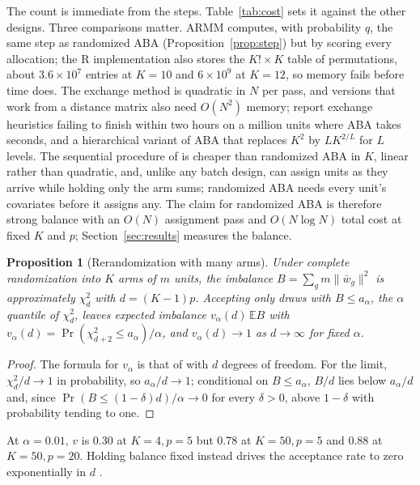 \documentclass[11pt]{article}
\newtheorem{proposition}{Proposition}
\theoremstyle{remark}
\newcommand{\E}{\mathbb{E}}
\begin{document}
The count is immediate from the steps. Table~\ref{tab:cost} sets it against
the other designs. Three comparisons matter. ARMM computes, with probability
$q$, the same step as randomized ABA (Proposition~\ref{prop:step}) but by
scoring every allocation; the R implementation also stores the $K! \times K$
table of permutations, about $3.6 \times 10^7$ entries at $K = 10$ and $6
\times 10^9$ at $K = 12$, so memory fails before time does. The exchange
method is quadratic in $N$ per pass, and versions that work from a distance
matrix also need $O(N^2)$ memory; \citet{baumann2026} report exchange
heuristics failing to finish within two hours on a million units where ABA
takes seconds, and a hierarchical variant of ABA that replaces $K^2$ by
$LK^{2/L}$ for $L$ levels. The sequential procedure of \citet{zhang2023} is
cheaper than randomized ABA in $K$, linear rather than quadratic, and, unlike
any batch design, can assign units as they arrive while holding only the arm
sums; randomized ABA needs every unit's covariates before it assigns any. The
claim for randomized ABA is therefore strong balance with an $O(N)$
assignment pass and $O(N \log N)$ total cost at fixed $K$ and $p$;
Section~\ref{sec:results} measures the balance.

\begingroup
\setlength{\tabcolsep}{4pt}

\endgroup

\begin{proposition}[Rerandomization with many arms]\label{prop:rr}
Under complete randomization into $K$ arms of $m$ units, the imbalance $B =
\sum_g m \|\bar w_g\|^2$ is approximately $\chi^2_d$ with $d = (K-1)p$.
Accepting only draws with $B \le a_\alpha$, the $\alpha$ quantile of
$\chi^2_d$, leaves expected imbalance
$v_\alpha(d)\,\E B$ with $v_\alpha(d) = \Pr(\chi^2_{d+2} \le
a_\alpha)/\alpha$, and $v_\alpha(d) \to 1$ as $d \to \infty$ for fixed
$\alpha$.
\end{proposition}

\begin{proof}
The formula for $v_\alpha$ is that of \citet{morgan2012} with $d$ degrees of
freedom. For the limit, $\chi^2_d/d \to 1$ in probability, so $a_\alpha / d
\to 1$; conditional on $B \le a_\alpha$, $B/d$ lies below $a_\alpha/d$ and,
since $\Pr(B \le (1-\delta)d)/\alpha \to 0$ for every $\delta > 0$, above
$1 - \delta$ with probability tending to one.
\end{proof}

At $\alpha = 0.01$, $v$ is 0.30 at $K = 4, p = 5$ but 0.78 at $K = 50, p =
5$ and 0.88 at $K = 50, p = 20$. Holding balance fixed instead drives the
acceptance rate to zero exponentially in $d$ \citep{qin2024}.
\end{document}
